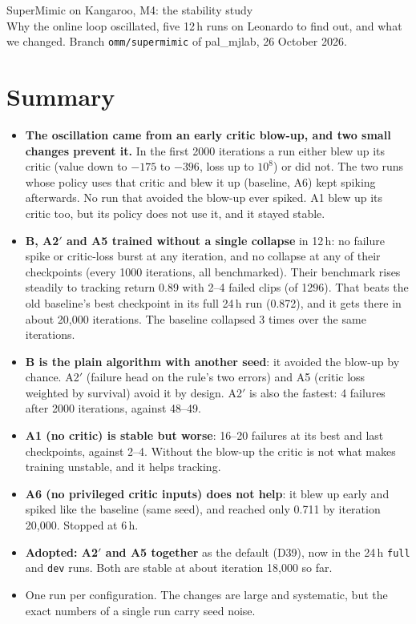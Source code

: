 \documentclass[10pt]{article}
\begin{document}
\sloppy

\begin{center}
{\LARGE SuperMimic on Kangaroo, M4: the stability study}\\[4pt]
Why the online loop oscillated, five 12\,h runs on Leonardo to find out, and what we changed. Branch
\texttt{omm/supermimic} of pal\_mjlab, 26 October 2026.
\end{center}

\section*{Summary}

\begin{itemize}
  \item \textbf{The oscillation came from an early critic blow-up, and two small changes prevent it.}
  In the first 2000 iterations a run either blew up its critic (value down to $-175$ to $-396$, loss up
  to $10^8$) or did not. The two runs whose policy uses that critic and blew it up (baseline, A6) kept
  spiking afterwards. No run that avoided the blow-up ever spiked. A1 blew up its critic too, but its
  policy does not use it, and it stayed stable.
  \item \textbf{B, A2$'$ and A5 trained without a single collapse} in 12\,h: no failure spike or
  critic-loss burst at any iteration, and no collapse at any of their checkpoints (every 1000
  iterations, all benchmarked). Their benchmark rises
  steadily to tracking return 0.89 with 2--4 failed clips (of 1296). That beats the old baseline's best
  checkpoint in its full 24\,h run (0.872), and it gets there in about 20,000 iterations. The baseline
  collapsed 3 times over the same iterations.
  \item \textbf{B is the plain algorithm with another seed}: it avoided the blow-up by chance. A2$'$
  (failure head on the rule's two errors) and A5 (critic loss weighted by survival) avoid it by design.
  A2$'$ is also the fastest: 4 failures after 2000 iterations, against 48--49.
  \item \textbf{A1 (no critic) is stable but worse}: 16--20 failures at its best and last checkpoints,
  against 2--4. Without the blow-up the critic is not what makes training unstable, and it helps
  tracking.
  \item \textbf{A6 (no privileged critic inputs) does not help}: it blew up early and spiked like the
  baseline (same seed), and reached only 0.711 by iteration 20,000. Stopped at 6\,h.
  \item \textbf{Adopted: A2$'$ and A5 together} as the default (D39), now in the 24\,h \texttt{full}
  and \texttt{dev} runs. Both are stable at about iteration 18,000 so far.
  \item One run per configuration. The changes are large and systematic, but the exact numbers of a
  single run carry seed noise.
\end{itemize}
\end{document}
